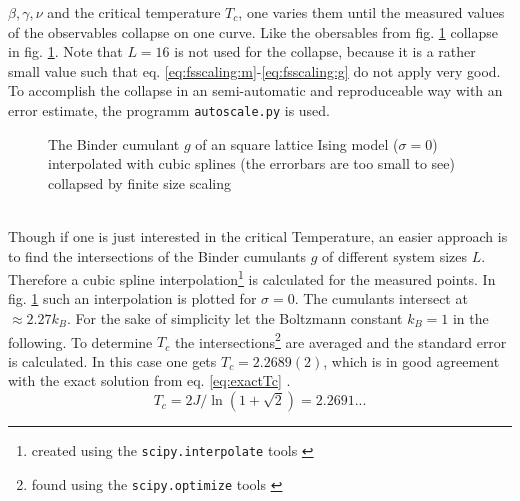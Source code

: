     \(\beta, \gamma, \nu\) and the critical temperature \(T_c\), one
    varies them until the measured values of the observables collapse on
    one curve. Like the obersables from fig. \ref{fig:gettingCrit}
    collapse in fig. \ref{fig:gettingCrit}.
    Note that \(L=16\) is not used for the collapse, because it is a
    rather small value such that eq. \eqref{eq:fsscaling:m}-\eqref{eq:fsscaling:g}
    do not apply very good.\\
    To accomplish the collapse in an semi-automatic and reproduceable
    way with an error estimate, the programm
    \texttt{autoscale.py} \cite{autoscale2009} is used.
    \begin{figure}[htbp]
        \centering
        \caption[Examples of determining critical temperature and exponents]
        {
            The Binder cumulant \(g\) of an square lattice Ising model
            (\(\sigma=0\))\\
             interpolated
                with cubic splines (the errorbars are too small to see)\\
             collapsed by finite
                size scaling
        }
        \label{fig:gettingCrit}
    \end{figure}\\
    Though if one is just interested in the critical Temperature, an
    easier approach is to find the intersections of the Binder cumulants
    \(g\) of different system sizes \(L\).
    Therefore a cubic spline interpolation\footnote{created using the \texttt{scipy.interpolate} tools \cite{scipy2001}}
    is calculated for the measured points.
    In fig. \ref{fig:gettingCrit}
    such an interpolation is plotted for \(\sigma=0\). The cumulants
    intersect at \(\approx 2.27 k_{B}\). For the sake of simplicity let
    the Boltzmann constant \(k_{B}=1\) in the following.
    To determine \(T_c\) the intersections\footnote{found using the \texttt{scipy.optimize} tools \cite{scipy2001}}
    are averaged and the standard error is calculated. In this case one
    gets \(T_c = 2.2689(2)\), which is in good agreement with the
    exact solution from eq. \eqref{eq:exactTc} \cite{Onsager1944}.
    \begin{equation}
        T_c = 2J/\ln(1+\sqrt 2) = 2.2691...
        \label{eq:exactTc}
    \end{equation}

